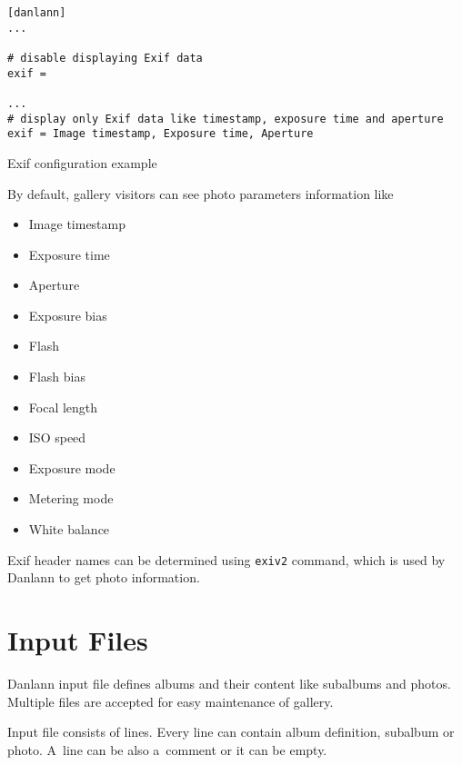 \documentclass{article}
\begin{document}
\begin{listing}
\begin{lstlisting}
[danlann]
...

# disable displaying Exif data
exif =

...
# display only Exif data like timestamp, exposure time and aperture
exif = Image timestamp, Exposure time, Aperture
\end{lstlisting}
\caption{Exif configuration example}\label{conf:exif}
\end{listing}

By default, gallery visitors can see photo parameters information like

\begin{multicols}{3}
\begin{itemize}
\item Image timestamp
\item Exposure time
\item Aperture
\item Exposure bias
\item Flash
\item Flash bias
\item Focal length
\item ISO speed
\item Exposure mode
\item Metering mode
\item White balance
\end{itemize}
\end{multicols}

Exif header names can be determined using \texttt{exiv2} command, which is
used by Danlann to get photo information.


\section{Input Files}\label{albums}
Danlann input file defines albums and their content like subalbums and
photos. Multiple files are accepted for easy maintenance of gallery.

Input file consists of lines. Every line can contain album definition,
subalbum or photo. A~line can be also a~comment or it can be empty.
\end{document}
